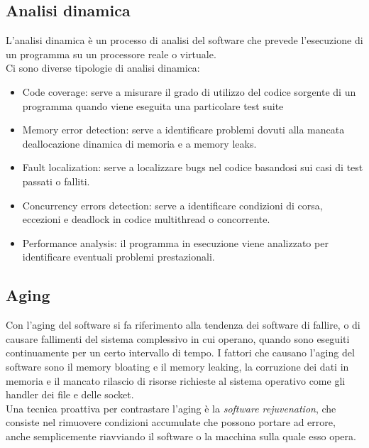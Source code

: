 \documentclass{article}
\begin{document}
\subsection{Analisi dinamica}
\label{sec:analisidinamica}

L'analisi dinamica è un processo di analisi del software che prevede
l'esecuzione di un programma su un processore reale o virtuale. \\

Ci sono diverse tipologie di analisi dinamica:

\begin{itemize}
    \item Code coverage: serve a misurare il grado di utilizzo del codice
    sorgente di un programma quando viene eseguita una particolare test suite
    \item Memory error detection: serve a identificare problemi dovuti alla
    mancata deallocazione dinamica di memoria e a memory leaks.
    \item Fault localization: serve a localizzare bugs nel codice basandosi sui
    casi di test passati o falliti.
    \item Concurrency errors detection: serve a identificare condizioni di
    corsa, eccezioni e deadlock in codice multithread o concorrente.
    \item Performance analysis: il programma in esecuzione viene analizzato per
    identificare eventuali problemi prestazionali.
\end{itemize}

\subsection{Aging}
\label{sec:aging}

Con l'aging del software si fa riferimento alla tendenza dei software di
fallire, o di causare fallimenti del sistema complessivo in cui operano, quando
sono eseguiti continuamente per un certo intervallo di tempo. I fattori che
causano l'aging del software sono il memory bloating e il memory leaking, la
corruzione dei dati in memoria e il mancato rilascio di risorse richieste al
sistema operativo come gli handler dei file e delle socket. \\

Una tecnica proattiva per contrastare l'aging è la \emph{software rejuvenation},
che consiste nel rimuovere condizioni accumulate che possono portare ad errore,
anche semplicemente riavviando il software o la macchina sulla quale esso
opera. \\
\end{document}
